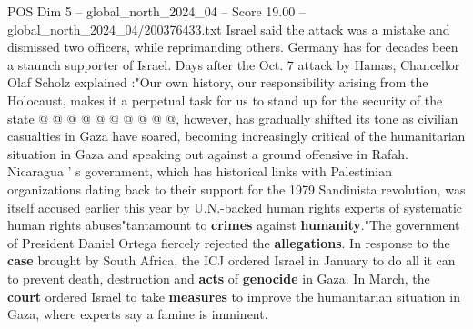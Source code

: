 \begin{textsample}{POS Dim 5 – global\_north\_2024\_04 – Score 19.00 – global\_north\_2024\_04/200376433.txt}
Israel said the attack was a mistake and dismissed two officers, while reprimanding others.
Germany has for decades been a staunch supporter of Israel.
Days after the Oct. 7 attack by Hamas, Chancellor Olaf Scholz explained :"Our own history, our responsibility arising from the Holocaust, makes it a perpetual task for us to stand up for the security of the state @ @ @ @ @ @ @ @ @ @, however, has gradually shifted its tone as civilian casualties in Gaza have soared, becoming increasingly critical of the humanitarian situation in Gaza and speaking out against a ground offensive in Rafah.
Nicaragua ' s government, which has historical links with Palestinian organizations dating back to their support for the 1979 Sandinista revolution, was itself accused earlier this year by U.N.-backed human rights experts of systematic human rights abuses"tantamount to \textbf{crimes} against \textbf{humanity}."The government of President Daniel Ortega fiercely rejected the \textbf{allegations}.
In response to the \textbf{case} brought by South Africa, the ICJ ordered Israel in January to do all it can to prevent death, destruction and \textbf{acts} of \textbf{genocide} in Gaza.
In March, the \textbf{court} ordered Israel to take \textbf{measures} to improve the humanitarian situation in Gaza, where experts say a famine is imminent.

\end{textsample}
